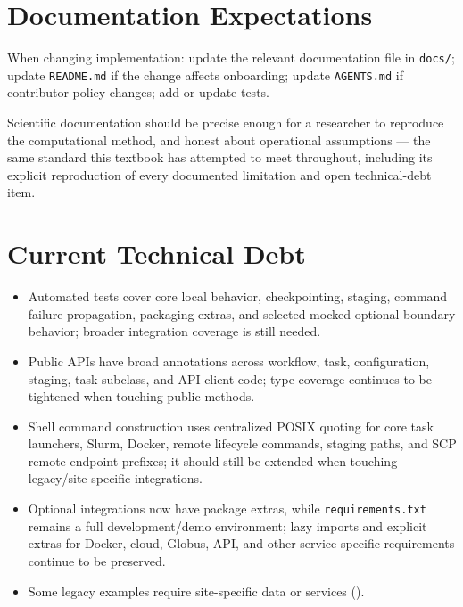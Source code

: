 \section{Documentation Expectations}

When changing implementation: update the relevant documentation file in
\texttt{docs/}; update \texttt{README.md} if the change affects onboarding;
update \texttt{AGENTS.md} if contributor policy changes; add or update
tests.

\begin{practicebox}
Scientific documentation should be precise enough for a researcher to
reproduce the computational method, and honest about operational
assumptions --- the same standard this textbook has attempted to meet
throughout, including its explicit reproduction of every documented
limitation and open technical-debt item.
\end{practicebox}

\section{Current Technical Debt}

\begin{itemize}[leftmargin=1.4em]
  \item Automated tests cover core local behavior, checkpointing, staging,
    command failure propagation, packaging extras, and selected mocked
    optional-boundary behavior; broader integration coverage is still
    needed.
  \item Public APIs have broad annotations across workflow, task,
    configuration, staging, task-subclass, and API-client code; type
    coverage continues to be tightened when touching public methods.
  \item Shell command construction uses centralized POSIX quoting for core
    task launchers, Slurm, Docker, remote lifecycle commands, staging
    paths, and SCP remote-endpoint prefixes; it should still be extended
    when touching legacy/site-specific integrations.
  \item Optional integrations now have package extras, while
    \texttt{requirements.txt} remains a full development/demo environment;
    lazy imports and explicit extras for Docker, cloud, Globus, API, and
    other service-specific requirements continue to be preserved.
  \item Some legacy examples require site-specific data or services
    ().
\end{itemize}
